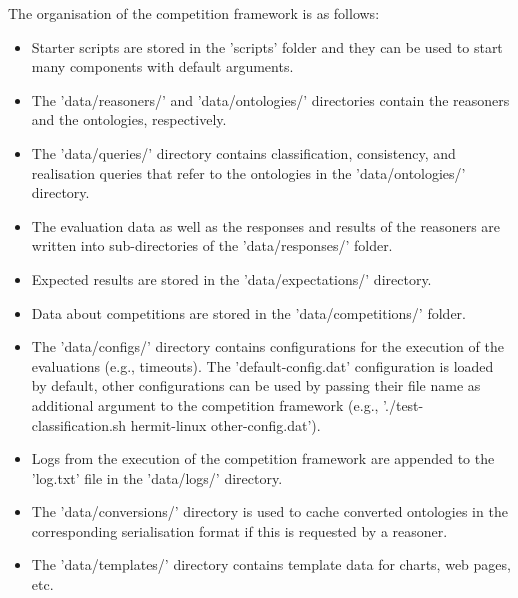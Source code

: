 \documentclass{article}
\begin{document}
The organisation of the competition framework is as follows:
\begin{itemize}
\item Starter scripts are stored in the 'scripts' folder and they can be used to start many components with default arguments.
\item The 'data/reasoners/' and 'data/ontologies/' directories contain the reasoners and the ontologies, respectively.
\item The 'data/queries/' directory contains classification, consistency, and realisation queries that refer to the ontologies in the 'data/ontologies/' directory.
\item The evaluation data as well as the responses and results of the reasoners are written into sub-directories of the 'data/responses/' folder.
\item Expected results are stored in the 'data/expectations/' directory.
\item Data about competitions are stored in the 'data/competitions/' folder.
\item The 'data/configs/' directory contains configurations for the execution of the evaluations (e.g., timeouts). The 'default-config.dat' configuration is loaded by default, other configurations can be used by passing their file name as additional argument to the competition framework (e.g., './test-classification.sh hermit-linux other-config.dat').
\item Logs from the execution of the competition framework are appended to the 'log.txt' file in the 'data/logs/' directory.
\item The 'data/conversions/' directory is used to cache converted ontologies in the corresponding serialisation format if this is requested by a reasoner.
\item The 'data/templates/' directory contains template data for charts, web pages, etc.
\end{itemize}
\end{document}
